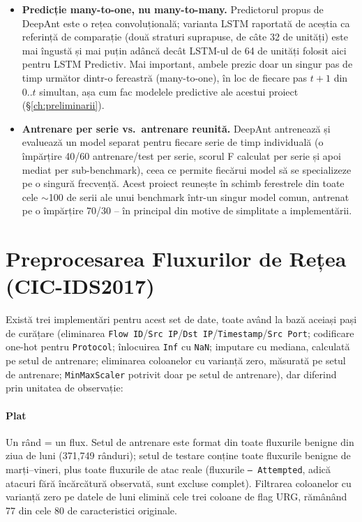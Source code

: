 \begin{itemize}
  \item \textbf{Predicție many-to-one, nu many-to-many.} Predictorul propus de DeepAnt este o rețea convoluțională; varianta LSTM raportată de aceștia ca referință de comparație (două straturi suprapuse, de câte 32 de unități) este mai îngustă și mai puțin adâncă decât LSTM-ul de 64 de unități folosit aici pentru LSTM Predictiv. Mai important, ambele prezic doar un singur pas de timp următor dintr-o fereastră (many-to-one), în loc de fiecare pas $t{+}1$ din $0..t$ simultan, așa cum fac modelele predictive ale acestui proiect (\S\ref{ch:preliminarii}).
  \item \textbf{Antrenare per serie vs.\ antrenare reunită.} DeepAnt antrenează și evaluează un model separat pentru fiecare serie de timp individuală (o împărțire 40/60 antrenare/test per serie, scorul F calculat per serie și apoi mediat per sub-benchmark), ceea ce permite fiecărui model să se specializeze pe o singură frecvență. Acest proiect reunește în schimb ferestrele din toate cele $\sim$100 de serii ale unui benchmark într-un singur model comun, antrenat pe o împărțire 70/30 -- în principal din motive de simplitate a implementării.
\end{itemize}

\section{Preprocesarea Fluxurilor de Rețea (CIC-IDS2017)}

Există trei implementări pentru acest set de date, toate având la bază aceiași pași de curățare (eliminarea \texttt{Flow ID}/\texttt{Src IP}/\texttt{Dst IP}/\texttt{Timestamp}/\texttt{Src Port}; codificare one-hot pentru \texttt{Protocol}; înlocuirea \texttt{Inf} cu \texttt{NaN}; imputare cu mediana, calculată pe setul de antrenare; eliminarea coloanelor cu varianță zero, măsurată pe setul de antrenare; \texttt{MinMaxScaler} potrivit doar pe setul de antrenare), dar diferind prin unitatea de observație:

\paragraph{Plat} Un rând = un flux. Setul de antrenare este format din toate fluxurile benigne din ziua de luni (371{,}749 rânduri); setul de testare conține toate fluxurile benigne de marți--vineri, plus toate fluxurile de atac reale (fluxurile \texttt{-- Attempted}, adică atacuri fără încărcătură observată, sunt excluse complet). Filtrarea coloanelor cu varianță zero pe datele de luni elimină cele trei coloane de flag URG, rămânând 77 din cele 80 de caracteristici originale.

